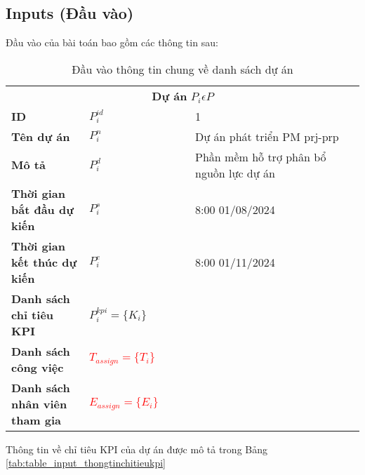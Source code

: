 \documentclass{article}
\begin{document}
\subsection{Inputs (Đầu vào)}
    Đầu vào của bài toán bao gồm các thông tin sau: 
        \begin{table} [htbp]
            \caption{Đầu vào thông tin chung về danh sách dự án}
            \centering
            \begin{tabular}{p{0.22\linewidth} p{0.3\linewidth} p{0.53\linewidth}} 
                \toprule
                \multicolumn{3}{c}{\textbf{Dự án} \textit{$P_{i}\epsilon P$}}\\
                \textbf{ID} & $P_i^{id}$ & 1\\ 
                \textbf{Tên dự án} & $P_i^n$ & Dự án phát triển PM prj-prp\\ 
                \textbf{Mô tả} & $P_i^d$ & Phần mềm hỗ trợ phân bổ nguồn lực dự án\\ 
                \textbf{Thời gian bắt đầu dự kiến} & $P_i^s$ & 8:00 01/08/2024\\ 
                \textbf{Thời gian kết thúc dự kiến} & $P_i^e$ & 8:00 01/11/2024\\ 
                \textbf{Danh sách chỉ tiêu KPI} & $P_i^{kpi} = \lbrace K_i \rbrace$ & \\
                \textbf{Danh sách công việc} & \textcolor{red}{$T_{assign} = \{T_i\}$} & \\
             \textbf{Danh sách nhân viên tham gia} & \textcolor{red}{$E_{assign} = \{E_i\}$} & \\
            
                \bottomrule             
            \end{tabular}
            \label{tab:table_input_thongtinchung}
        \end{table}
    Thông tin về chỉ tiêu KPI của dự án được mô tả trong Bảng \ref{tab:table_input_thongtinchitieukpi}
\end{document}
